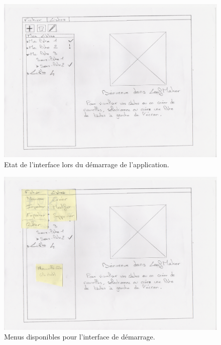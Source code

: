 		\begin{figure}[h!]
			\centering
		   \includegraphics[scale=1.5]{img/pp_ihm_1.png}
		   \caption{Etat de l'interface lors du démarrage de l'application.}
		\end{figure}
		\FloatBarrier
	
		\begin{figure}[h!]
			\centering
		   \includegraphics[scale=1.5]{img/pp_ihm_2.png}
		   \caption{Menus disponibles pour l'interface de démarrage.}
		\end{figure}
		\FloatBarrier
	
